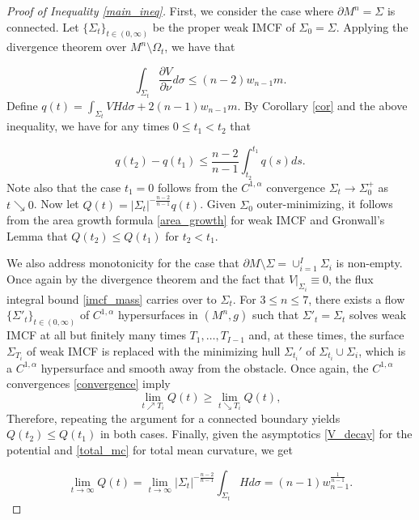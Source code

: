 \documentclass[12pt]{amsart}
\theoremstyle{definition}
\numberwithin{equation}{section}
\begin{document}
\begin{proof}[Proof of Inequality \eqref{main_ineq}]
First, we consider the case where $\partial M^{n}=\Sigma$ is connected. Let $\{ \Sigma_{t} \}_{t \in (0,\infty)}$ be the proper weak IMCF of $\Sigma_{0}= \Sigma$. Applying the divergence theorem over $M^{n} \setminus \Omega_{t}$, we have that 

\begin{equation*}
    \int_{\Sigma_{t}} \frac{\partial V}{\partial \nu} d\sigma \leq (n-2)w_{n-1} m.
\end{equation*}
Define $q(t)= \int_{\Sigma_{t}} VH d\sigma + 2(n-1)w_{n-1} m$. By Corollary \ref{cor} and the above inequality, we have for any times $0 \leq t_{1} < t_{2}$ that

\begin{equation*}
    q(t_{2}) - q(t_{1}) \leq \frac{n-2}{n-1} \int_{t_{2}}^{t_{1}} q(s)ds.
\end{equation*}
Note also that the case $t_{1} =0$ follows from the $C^{1,\alpha}$ convergence $\Sigma_{t} \rightarrow \Sigma_{0}^{+}$ as $t \searrow 0$. Now let $Q(t)= |\Sigma_{t}|^{-\frac{n-2}{n-1}} q(t)$. Given $\Sigma_{0}$ outer-minimizing, it follows from the area growth formula \eqref{area_growth} for weak IMCF and Gronwall's Lemma that $Q(t_{2}) \leq Q(t_{1})$ for $t_{2} < t_{1}$.

We also address monotonicity for the case that $\partial M \setminus \Sigma= \cup_{i=1}^{I} \Sigma_{i}$ is non-empty. Once again by the divergence theorem and the fact that $V|_{\Sigma_{i}} \equiv 0$, the flux integral bound \eqref{imcf_mass} carries over to $\Sigma_{t}$. For $3 \leq n \leq 7$, there exists a flow $\{ \Sigma'_{t} \}_{t \in (0,\infty)}$ of $C^{1,\alpha}$ hypersurfaces in $(M^{n},g)$ such that $\Sigma'_{t}=\Sigma_{t}$ solves weak IMCF at all but finitely many times $T_{1}, \dots, T_{I-1}$ and, at these times, the surface $\Sigma_{T_{i}}$ of weak IMCF is replaced with the minimizing hull $\Sigma_{t_{i}}'$ of $\Sigma_{t_{i}} \cup \Sigma_{i}$, which is a $C^{1,\alpha}$ hypersurface and smooth away from the obstacle. Once again, the $C^{1,\alpha}$ convergences \eqref{convergence} imply 
\begin{equation*}
    \lim_{t \nearrow T_{i}} Q(t) \geq \lim_{t \searrow T_{i}} Q(t),
\end{equation*}
Therefore, repeating the argument for a connected boundary yields $Q(t_{2}) \leq Q(t_{1})$ in both cases. Finally, given the asymptotics \eqref{V_decay} for the potential and \eqref{total_mc} for total mean curvature, we get

\begin{equation*}
   \lim_{t \rightarrow \infty} Q(t) = \lim_{t \rightarrow \infty} |\Sigma_{t}|^{-\frac{n-2}{n-1}} \int_{\Sigma_{t}} H d\sigma = (n-1) w_{n-1}^{\frac{1}{n-1}}.
\end{equation*}
\end{proof}
\end{document}
